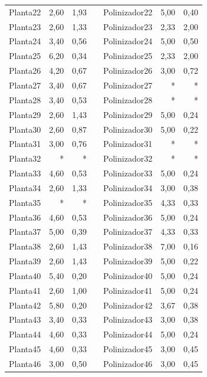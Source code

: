 \begin{table}[htbp]
\begin{tabular}{lrrrlrr}
    Planta22 & 2,60 & 1,93 &      & Polinizador22 & 5,00 & 0,40 \\
    Planta23 & 2,60 & 1,33 &      & Polinizador23 & 2,33 & 2,00 \\
    Planta24 & 3,40 & 0,56 &      & Polinizador24 & 5,00 & 0,50 \\
    Planta25 & 6,20 & 0,34 &      & Polinizador25 & 2,33 & 2,00 \\
    Planta26 & 4,20 & 0,67 &      & Polinizador26 & 3,00 & 0,72 \\
    Planta27 & 3,40 & 0,67 &      & Polinizador27 & *    & * \\
    Planta28 & 3,40 & 0,53 &      & Polinizador28 & *    & * \\
    Planta29 & 2,60 & 1,43 &      & Polinizador29 & 5,00 & 0,24 \\
    Planta30 & 2,60 & 0,87 &      & Polinizador30 & 5,00 & 0,22 \\
    Planta31 & 3,00 & 0,76 &      & Polinizador31 & *    & * \\
    Planta32 & *    & *    &      & Polinizador32 & *    & * \\
    Planta33 & 4,60 & 0,53 &      & Polinizador33 & 5,00 & 0,24 \\
    Planta34 & 2,60 & 1,33 &      & Polinizador34 & 3,00 & 0,38 \\
    Planta35 & *    & *    &      & Polinizador35 & 4,33 & 0,33 \\
    Planta36 & 4,60 & 0,53 &      & Polinizador36 & 5,00 & 0,24 \\
    Planta37 & 5,00 & 0,39 &      & Polinizador37 & 4,33 & 0,33 \\
    Planta38 & 2,60 & 1,43 &      & Polinizador38 & 7,00 & 0,16 \\
    Planta39 & 2,60 & 1,43 &      & Polinizador39 & 5,00 & 0,22 \\
    Planta40 & 5,40 & 0,20 &      & Polinizador40 & 5,00 & 0,24 \\
    Planta41 & 2,60 & 1,00 &      & Polinizador41 & 5,00 & 0,24 \\
    Planta42 & 5,80 & 0,20 &      & Polinizador42 & 3,67 & 0,38 \\
    Planta43 & 3,40 & 0,33 &      & Polinizador43 & 3,00 & 0,38 \\
    Planta44 & 4,60 & 0,33 &      & Polinizador44 & 5,00 & 0,24 \\
    Planta45 & 4,60 & 0,33 &      & Polinizador45 & 3,00 & 0,45 \\
    Planta46 & 3,00 & 0,50 &      & Polinizador46 & 3,00 & 0,45 \\

\end{tabular}
\end{table}
